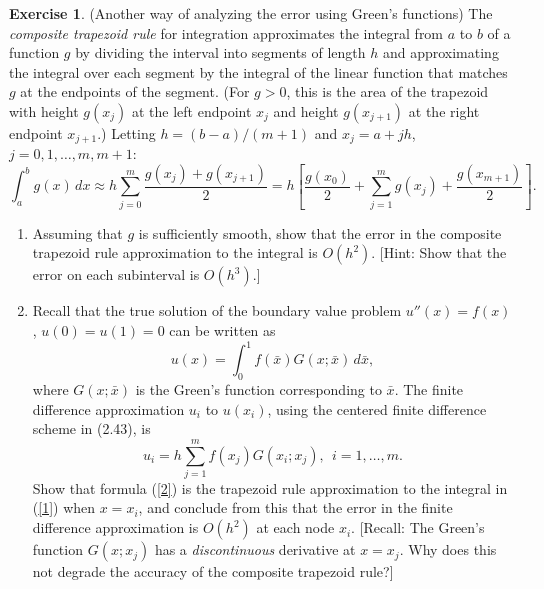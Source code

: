 \documentclass[12pt]{article}
\theoremstyle{definition}
\newtheorem{exer}{Exercise}
\theoremstyle{remark}
\begin{document}
\begin{exer}
(Another way of analyzing the error using Green's functions)
The {\em composite trapezoid rule} for integration approximates the
integral from $a$ to $b$ of a function $g$ by dividing the interval
into segments of length $h$ and approximating the integral over each
segment by the integral of the linear function that matches $g$ at
the endpoints of the segment. (For $g > 0$, this is the area of
the trapezoid with height $g( x_j )$ at the left endpoint $x_j$
and height $g( x_{j+1} )$ at the right endpoint $x_{j+1}$.)  Letting
$h = (b-a)/(m+1)$ and $x_j = a + jh$, $j = 0,1, \ldots , m, m+1$:
\[
\int_a^b g(x)\,dx \approx  h \sum_{j=0}^m \frac{g( x_j )+g( x_{j+1} )}{2} 
     =  h \left[ \frac{g( x_0 )}{2} + \sum_{j=1}^m g( x_j ) + 
                   \frac{g( x_{m+1} )}{2} \right] .
\]

\begin{enumerate}
\item
Assuming that $g$ is sufficiently smooth, show that the error in the 
composite trapezoid rule approximation to the integral is $O( h^2 )$.
[Hint:  Show that the error on each subinterval is $O( h^3 )$.]

\item
Recall that the true solution of the boundary value problem $u'' (x) = f(x)$,
$u(0) = u(1) = 0$ can be written as
\begin{equation}
u(x) = \int_0^1 f( \bar{x} ) G(x; \bar{x} )\,d \bar{x} , \label{1}
\end{equation}
where $G(x; \bar{x})$ is the Green's function corresponding to
$\bar{x}$.  The finite difference approximation $u_i$ to $u( x_i )$, 
using the centered finite difference scheme in (2.43), is
\begin{equation}
u_i = h \sum_{j=1}^m f( x_j ) G( x_i ; x_j ) ,~~i=1, \ldots , m . \label{2}
\end{equation}
Show that formula (\ref{2}) is the trapezoid rule approximation to 
the integral in (\ref{1}) when $x = x_i$, and conclude from this that the 
error in the finite difference approximation is $O( h^2 )$ at each node $x_i$. 
[Recall:  The Green's function $G( x ; x_j )$ has a {\em discontinuous}
derivative at $x = x_j$.  Why does this not degrade the accuracy of the
composite trapezoid rule?]
\end{enumerate}
\end{exer}
\end{document}
